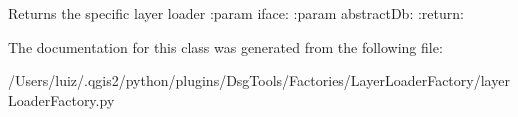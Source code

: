 \begin{DoxyVerb}Returns the specific layer loader
:param iface:
:param abstractDb:
:return:
\end{DoxyVerb}
 

The documentation for this class was generated from the following file\+:\begin{DoxyCompactItemize}
\item 
/\+Users/luiz/.\+qgis2/python/plugins/\+Dsg\+Tools/\+Factories/\+Layer\+Loader\+Factory/layer\+Loader\+Factory.\+py\end{DoxyCompactItemize}
